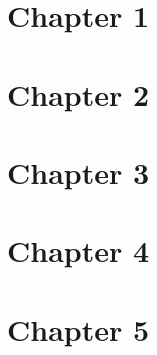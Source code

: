 \documentclass{wileySix}
\begin{document}

\chapter{Chapter 1}
%
%
%
%
%
%
%
%
%
%
%
%
%
%
%
%
%

\chapter{Chapter 2}
%
%
%
%
%
%
%
%
%
%
%
%
%
%
%
%

\chapter{Chapter 3}










\chapter{Chapter 4}

%
%

\chapter{Chapter 5}

%
%
\end{document}
